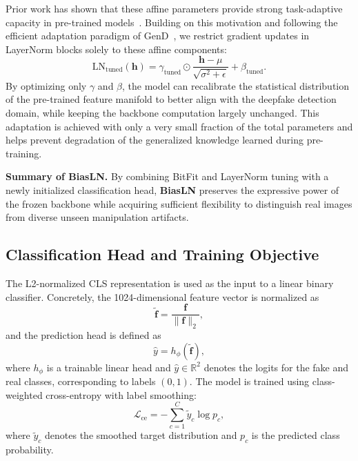 \documentclass[fonts]{icst}
\begin{document}
Prior work has shown that these affine parameters provide strong task-adaptive capacity in pre-trained models~\cite{wang2022ln,giannou2023layernorm}.
Building on this motivation and following the efficient adaptation paradigm of GenD~\cite{yermakov2025gend}, we restrict gradient updates in LayerNorm blocks solely to these affine components:
\begin{equation}
    \mathrm{LN}_{\text{tuned}}(\mathbf{h}) = \gamma_{\text{tuned}} \odot \frac{\mathbf{h} - \mu}{\sqrt{\sigma^2 + \epsilon}} + \beta_{\text{tuned}}.
\end{equation}
By optimizing only $\gamma$ and $\beta$, the model can recalibrate the statistical distribution of the pre-trained feature manifold to better align with the deepfake detection domain, while keeping the backbone computation largely unchanged.
This adaptation is achieved with only a very small fraction of the total parameters and helps prevent degradation of the generalized knowledge learned during pre-training.

\vspace{0.5em}
\noindent \textbf{Summary of BiasLN.}
By combining BitFit and LayerNorm tuning with a newly initialized classification head, \textbf{BiasLN} preserves the expressive power of the frozen backbone while acquiring sufficient flexibility to distinguish real images from diverse unseen manipulation artifacts.

\subsection{Classification Head and Training Objective}

The L2-normalized CLS representation is used as the input to a linear binary classifier.
Concretely, the 1024-dimensional feature vector is normalized as
\begin{equation}
\tilde{\mathbf{f}} = \frac{\mathbf{f}}{\lVert \mathbf{f} \rVert_2},
\end{equation}
and the prediction head is defined as
\begin{equation}
\hat{y} = h_{\phi}(\tilde{\mathbf{f}}),
\end{equation}
where $h_{\phi}$ is a trainable linear head and $\hat{y} \in \mathbb{R}^2$ denotes the logits for the fake and real classes, corresponding to labels $(0, 1)$.
The model is trained using class-weighted cross-entropy with label smoothing:
\begin{equation}
\mathcal{L}_{\text{ce}} = - \sum_{c=1}^{C} \tilde{y}_c \log p_c,
\end{equation}
where $\tilde{y}_c$ denotes the smoothed target distribution and $p_c$ is the predicted class probability.
\end{document}
